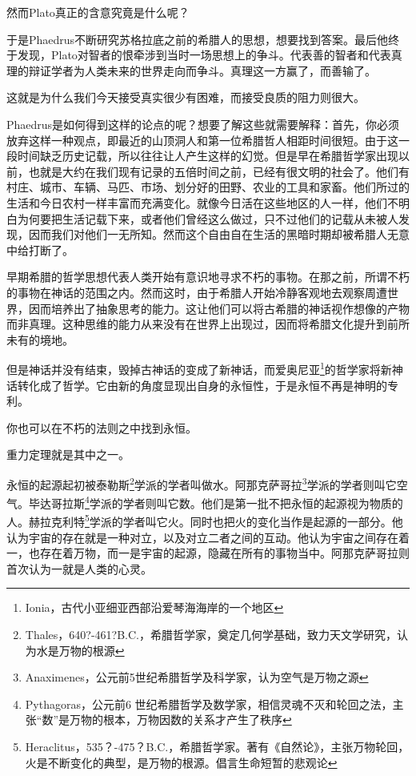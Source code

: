 \documentclass[UTF8]{article}
\begin{document}
\par 然而Plato真正的含意究竟是什么呢？
\par 于是Phaedrus不断研究苏格拉底之前的希腊人的思想，想要找到答案。最后他终于发现，Plato对智者的恨牵涉到当时一场思想上的争斗。代表善的智者和代表真理的辩证学者为人类未来的世界走向而争斗。真理这一方赢了，而善输了。
\par 这就是为什么我们今天接受真实很少有困难，而接受良质的阻力则很大。
\par Phaedrus是如何得到这样的论点的呢？想要了解这些就需要解释：首先，你必须放弃这样一种观点，即最近的山顶洞人和第一位希腊哲人相距时间很短。由于这一段时间缺乏历史记载，所以往往让人产生这样的幻觉。但是早在希腊哲学家出现以前，也就是大约在我们现有记录的五倍时间之前，已经有很文明的社会了。他们有村庄、城市、车辆、马匹、市场、划分好的田野、农业的工具和家畜。他们所过的生活和今日农村一样丰富而充满变化。就像今日活在这些地区的人一样，他们不明白为何要把生活记载下来，或者他们曾经这么做过，只不过他们的记载从未被人发现，因而我们对他们一无所知。然而这个自由自在生活的黑暗时期却被希腊人无意中给打断了。
\par 早期希腊的哲学思想代表人类开始有意识地寻求不朽的事物。在那之前，所谓不朽的事物在神话的范围之内。然而这时，由于希腊人开始冷静客观地去观察周遭世界，因而培养出了抽象思考的能力。这让他们可以将古希腊的神话视作想像的产物而非真理。这种思维的能力从来没有在世界上出现过，因而将希腊文化提升到前所未有的境地。
\par 但是神话并没有结束，毁掉古神话的变成了新神话，而爱奥尼亚\footnote{Ionia，古代小亚细亚西部沿爱琴海海岸的一个地区}的哲学家将新神话转化成了哲学。它由新的角度显现出自身的永恒性，于是永恒不再是神明的专利。
\par 你也可以在不朽的法则之中找到永恒。
\par 重力定理就是其中之一。
\par 永恒的起源起初被泰勒斯\footnote{Thales，640?-461?B.C.，希腊哲学家，奠定几何学基础，致力天文学研究，认为水是万物的根源}学派的学者叫做水。阿那克萨哥拉\footnote{Anaximenes，公元前5世纪希腊哲学及科学家，认为空气是万物之源}学派的学者则叫它空气。毕达哥拉斯\footnote{Pythagoras，公元前6 世纪希腊哲学及数学家，相信灵魂不灭和轮回之法，主张“数”是万物的根本，万物因数的关系才产生了秩序}学派的学者则叫它数。他们是第一批不把永恒的起源视为物质的人。赫拉克利特\footnote{Heraclitus，535？-475？B.C.，希腊哲学家。著有《自然论》，主张万物轮回，火是不断变化的典型，是万物的根源。倡言生命短暂的悲观论}学派的学者叫它火。同时也把火的变化当作是起源的一部分。他认为宇宙的存在就是一种对立，以及对立二者之间的互动。他认为宇宙之间存在着一，也存在着万物，而一是宇宙的起源，隐藏在所有的事物当中。阿那克萨哥拉则首次认为一就是人类的心灵。
\end{document}
